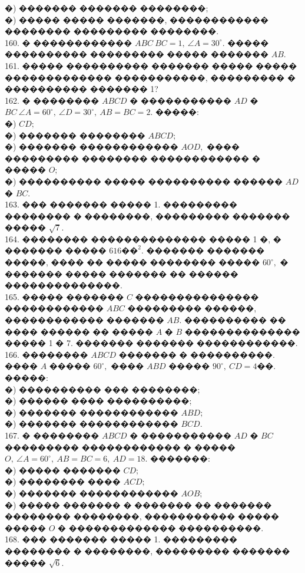 \documentclass[12pt]{article}
\begin{document}
�) ������� ������� ��������;\\
�) ����� ����� �������, ������������ �������� ��������� ��������.\\
160. � ������������ $ABC\ BC=1,\ \angle A=30^\circ.$ ����� ���������� ��������� ����� ������� $AB.$\\
161. ����� ���������� ������� ����� ����� ������������� �����������, ��������� � ���������� ������� 1?\\
162. � �������� $ABCD$ � ����������� $AD$ � $BC\ \angle A=60^\circ,\ \angle D=30^\circ,\ AB=BC=2.$ �����:\\
�) $CD;$\\
�) ������� �������� $ABCD;$\\
�) ������� ������������ $AOD,$ ���� ��������� �������� ������������ � ����� $O;$\\
�) ���������� ����� ���������� ������ $AD$ � $BC.$\\
163. ��� ������� ����� 1. ��������� �������� � ��������, ��������� ������� ����� $\sqrt{7}.$\\
164. �������� �������������� ����� 1 �, � ������� ����� $616\text{��}^2.$ ������� ������� �����, ���� �� ����� �������� ����� $60^\circ,$ � ������� ����� ������� �� ������ ��������������.\\
165. ����� ������� $C$ ��������������� ������������ $ABC$ ��������� ������, ������������ ������� $AB.$ ���������� �� ���� ������ �� ����� $A$ � $B$ �������������� ����� 1 � 7. ������� ������� ������������.\\
166. �������� $ABCD$ ������� � ����������. ���� $A$ ����� $60^\circ,$ ���� $ABD$ ����� $90^\circ,\ CD=4$��. �����:\\
�) ���������� ��� ��������;\\
�) ������ ���� ����������;\\
�) ������� ������������ $ABD;$\\
�) ������� ������������ $BCD.$\\
167. � �������� $ABCD$ � ����������� $AD$ � $BC$ ��������� ������������ � ����� $O,\ \angle A=60^\circ,\ AB=BC=6,\ AD=18.$ �������:\\
�) ����� ������� $CD;$\\
�) �������� ���� $ACD;$\\
�) ������� ������������ $AOB;$\\
�) ����� ������� � ������� �� ������� �������� ��������, ����������� ����� ����� $O$ � ������������� ����������.\\
168. ��� ������� ����� 1. ��������� �������� � ��������, ��������� ������� ����� $\sqrt{6}.$\\
\end{document}
